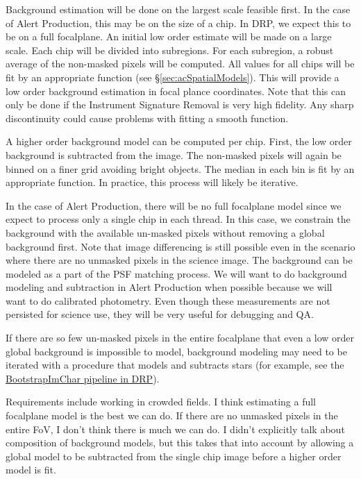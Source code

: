 Background estimation will be done on the largest scale feasible first.  In the case of Alert Production, this may be on the size of a chip.  In DRP, we expect this to be on a full focalplane.  An initial low order estimate will be made on a large scale.  Each chip will be divided into subregions.  For each subregion, a robust average of the non-masked pixels will be computed.  All values for all chips will be fit by an appropriate function (see \S \ref{sec:acSpatialModels}).  This will provide a low order background estimation in focal plance coordinates.  Note that this can only be done if the Instrument Signature Removal is very high fidelity.  Any sharp discontinuity could cause problems with fitting a smooth function.

A higher order background model can be computed per chip.  First, the low order background is subtracted from the image.  The non-masked pixels will again be binned on a finer grid avoiding bright objects.  The median in each bin is fit by an appropriate function.  In practice, this process will likely be iterative.

In the case of Alert Production, there will be no full focalplane model since we expect to process only a single chip in each thread.  In this case, we constrain the background with the available un-masked pixels without removing a global background first.  Note that image differencing is still possible even in the scenario where there are no unmasked pixels in the science image.  The background can be modeled as a part of the PSF matching process.  We will want to do background modeling and subtraction in Alert Production when possible because we will want to do calibrated photometry.  Even though these measurements are not persisted for science use, they will be very useful for debugging and QA.

If there are so few un-masked pixels in the entire focalplane that even a low order global background is impossible to model, background modeling may need to be iterated with a procedure that models and subtracts stars (for example, see the \hyperref[sec:drpBootstrapImChar]{BootstrapImChar pipeline in DRP}).

\begin{note}
Requirements include working in crowded fields.  I think estimating a full focalplane model is the best we can do.  If there are no unmasked pixels in the entire FoV, I don't think there is much we can do.
I didn't explicitly talk about composition of background models, but this takes that into account by allowing a global model to be subtracted from the single chip image before a higher order model is fit.
\end{note}

